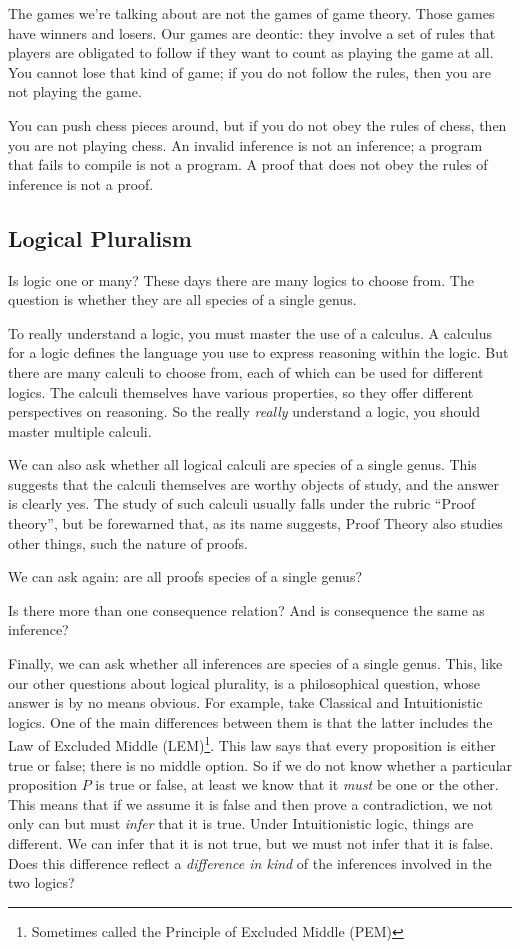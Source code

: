 \documentclass{article}
\begin{document}
The games we're talking about are not the games of game theory. Those
games have winners and losers. Our games are deontic: they involve a
set of rules that players are obligated to follow if they want to
count as playing the game at all. You cannot lose that kind of game;
if you do not follow the rules, then you are not playing the game.

You can push chess pieces around, but if you do not obey the rules of
chess, then you are not playing chess. An invalid inference is not an
inference; a program that fails to compile is not a program. A proof
that does not obey the rules of inference is not a proof.

\subsection{Logical Pluralism}

Is logic one or many? These days there are many logics to choose from.
The question is whether they are all species of a single genus.

To really understand a logic, you must master the use of a calculus. A
calculus for a logic defines the language you use to express reasoning
within the logic. But there are many calculi to choose from, each of
which can be used for different logics. The calculi themselves have
various properties, so they offer different perspectives on reasoning.
So the really \textit{really} understand a logic, you should master
multiple calculi.

We can also ask whether all logical calculi are species of a single
genus. This suggests that the calculi themselves are worthy objects of
study, and the answer is clearly yes. The study of such calculi
usually falls under the rubric ``Proof theory'', but be forewarned
that, as its name suggests, Proof Theory also studies other things,
such the nature of proofs.

We can ask again: are all proofs species of a single genus?

Is there more than one consequence relation? And is consequence the
same as inference?

Finally, we can ask whether all inferences are species of a single
genus. This, like our other questions about logical plurality, is a
philosophical question, whose answer is by no means obvious. For
example, take Classical and Intuitionistic logics. One of the main
differences between them is that the latter includes the Law of
Excluded Middle (LEM)\footnote{Sometimes called the Principle of
Excluded Middle (PEM)}. This law says that every proposition is either
true or false; there is no middle option. So if we do not know whether
a particular proposition \(P\) is true or false, at least we know that
it \textit{must} be one or the other. This means that if we assume it
is false and then prove a contradiction, we not only can but must
\textit{infer} that it is true. Under Intuitionistic logic, things are
different. We can infer that it is not true, but we must not infer
that it is false. Does this difference reflect a \textit{difference in
  kind} of the inferences involved in the two logics?
\end{document}
